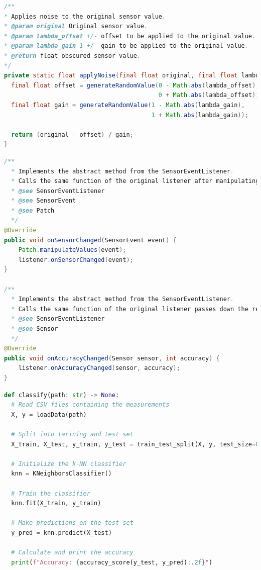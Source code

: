 \documentclass[11pt,
  oneside,openany,    %
]{scrreprt}
\begin{document}
\begin{lstlisting}[language=java, caption=Random Value Generation Function, label=lst:value_gen_func]
/**
* Applies noise to the original sensor value.
* @param original Original sensor value.
* @param lambda_offset +/- offset to be applied to the original value.
* @param lambda_gain 1 +/- gain to be applied to the original value.
* @return float obscured sensor value.
*/
private static float applyNoise(final float original, final float lambda_offset, final float lambda_gain) {
  final float offset = generateRandomValue(0 - Math.abs(lambda_offset), 
                                           0 + Math.abs(lambda_offset));
  final float gain = generateRandomValue(1 - Math.abs(lambda_gain), 
                                         1 + Math.abs(lambda_gain));
 
  return (original - offset) / gain;
}
\end{lstlisting}
\pagebreak
\begin{lstlisting}[language=java, caption=SensorEventListener Methods, label=lst:patchlistener]
/**
  * Implements the abstract method from the SensorEventListener.
  * Calls the same function of the original listener after manipulating the received SensorEvent and passes is down.
  * @see SensorEventListener
  * @see SensorEvent
  * @see Patch
  */
@Override
public void onSensorChanged(SensorEvent event) {
    Patch.manipulateValues(event);
    listener.onSensorChanged(event);
}

/**
  * Implements the abstract method from the SensorEventListener.
  * Calls the same function of the original listener passes down the received parameters.
  * @see SensorEventListener
  * @see Sensor
  */
@Override
public void onAccuracyChanged(Sensor sensor, int accuracy) {
    listener.onAccuracyChanged(sensor, accuracy);
}
\end{lstlisting}
\pagebreak
\begin{lstlisting}[language=python, caption=Classifier Function, label=lst:classifier]
def classify(path: str) -> None: 
  # Read CSV files containing the measurements  
  X, y = loadData(path)

  # Split into tarining and test set
  X_train, X_test, y_train, y_test = train_test_split(X, y, test_size=0.5, random_state=42)

  # Initialize the k-NN classifier
  knn = KNeighborsClassifier()

  # Train the classifier
  knn.fit(X_train, y_train)

  # Make predictions on the test set
  y_pred = knn.predict(X_test)

  # Calculate and print the accuracy
  print(f"Accuracy: {accuracy_score(y_test, y_pred):.2f}")
\end{lstlisting}
\end{document}
